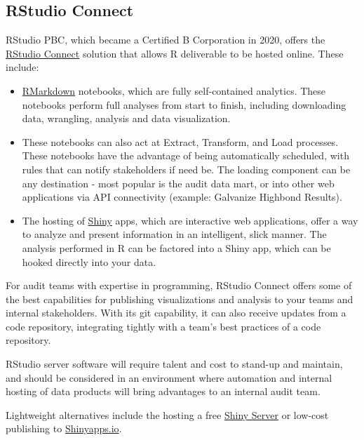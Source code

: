 \documentclass[
]{book}
\providecommand{\tightlist}{%
  \setlength{\itemsep}{0pt}\setlength{\parskip}{0pt}}
\begin{document}
\hypertarget{rstudio-connect}{%
\subsection{RStudio Connect}\label{rstudio-connect}}

RStudio PBC, which became a Certified B Corporation in 2020, offers the \href{https://rstudio.com/products/connect/}{RStudio Connect} solution that allows R deliverable to be hosted online. These include:

\begin{itemize}
\tightlist
\item
  \href{https://rmarkdown.rstudio.com}{RMarkdown} notebooks, which are fully self-contained analytics. These notebooks perform full analyses from start to finish, including downloading data, wrangling, analysis and data visualization.
\item
  These notebooks can also act at Extract, Transform, and Load processes. These notebooks have the advantage of being automatically scheduled, with rules that can notify stakeholders if need be. The loading component can be any destination - most popular is the audit data mart, or into other web applications via API connectivity (example: Galvanize Highbond Results).
\item
  The hosting of \href{https://shiny.rstudio.com}{Shiny} apps, which are interactive web applications, offer a way to analyze and present information in an intelligent, slick manner. The analysis performed in R can be factored into a Shiny app, which can be hooked directly into your data.
\end{itemize}

For audit teams with expertise in programming, RStudio Connect offers some of the best capabilities for publishing visualizations and analysis to your teams and internal stakeholders. With its git capability, it can also receive updates from a code repository, integrating tightly with a team's best practices of a code repository.

RStudio server software will require talent and cost to stand-up and maintain, and should be considered in an environment where automation and internal hosting of data products will bring advantages to an internal audit team.

Lightweight alternatives include the hosting a free \href{https://rstudio.com/products/shiny/shiny-server/}{Shiny Server} or low-cost publishing to \href{https://www.shinyapps.io}{Shinyapps.io}.
\end{document}
